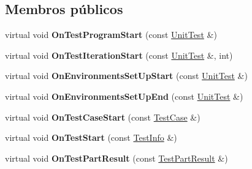 \subsection*{Membros públicos}
\begin{DoxyCompactItemize}
\item 
\hypertarget{classtesting_1_1EmptyTestEventListener_aa3847c8a3c22d8d69a6006dfdd6589fc}{virtual void {\bfseries On\-Test\-Program\-Start} (const \hyperlink{classtesting_1_1UnitTest}{Unit\-Test} \&)}\label{classtesting_1_1EmptyTestEventListener_aa3847c8a3c22d8d69a6006dfdd6589fc}

\item 
\hypertarget{classtesting_1_1EmptyTestEventListener_a836f05829855dc60d13ba99ad712c0dd}{virtual void {\bfseries On\-Test\-Iteration\-Start} (const \hyperlink{classtesting_1_1UnitTest}{Unit\-Test} \&, int)}\label{classtesting_1_1EmptyTestEventListener_a836f05829855dc60d13ba99ad712c0dd}

\item 
\hypertarget{classtesting_1_1EmptyTestEventListener_a156d1965248fbdced6aabacadfa2d63f}{virtual void {\bfseries On\-Environments\-Set\-Up\-Start} (const \hyperlink{classtesting_1_1UnitTest}{Unit\-Test} \&)}\label{classtesting_1_1EmptyTestEventListener_a156d1965248fbdced6aabacadfa2d63f}

\item 
\hypertarget{classtesting_1_1EmptyTestEventListener_abc481c6648d15d4242245195a06f5aa0}{virtual void {\bfseries On\-Environments\-Set\-Up\-End} (const \hyperlink{classtesting_1_1UnitTest}{Unit\-Test} \&)}\label{classtesting_1_1EmptyTestEventListener_abc481c6648d15d4242245195a06f5aa0}

\item 
\hypertarget{classtesting_1_1EmptyTestEventListener_ae4707ed9cc7ace5241bc8ccc4051209b}{virtual void {\bfseries On\-Test\-Case\-Start} (const \hyperlink{classtesting_1_1TestCase}{Test\-Case} \&)}\label{classtesting_1_1EmptyTestEventListener_ae4707ed9cc7ace5241bc8ccc4051209b}

\item 
\hypertarget{classtesting_1_1EmptyTestEventListener_a84fa74cc9ba742f9f847ea405ca84e5e}{virtual void {\bfseries On\-Test\-Start} (const \hyperlink{classtesting_1_1TestInfo}{Test\-Info} \&)}\label{classtesting_1_1EmptyTestEventListener_a84fa74cc9ba742f9f847ea405ca84e5e}

\item 
\hypertarget{classtesting_1_1EmptyTestEventListener_a59e7f7d9f2e2d089a6e8c1e2577f4718}{virtual void {\bfseries On\-Test\-Part\-Result} (const \hyperlink{classtesting_1_1TestPartResult}{Test\-Part\-Result} \&)}\label{classtesting_1_1EmptyTestEventListener_a59e7f7d9f2e2d089a6e8c1e2577f4718}


\end{DoxyCompactItemize}
